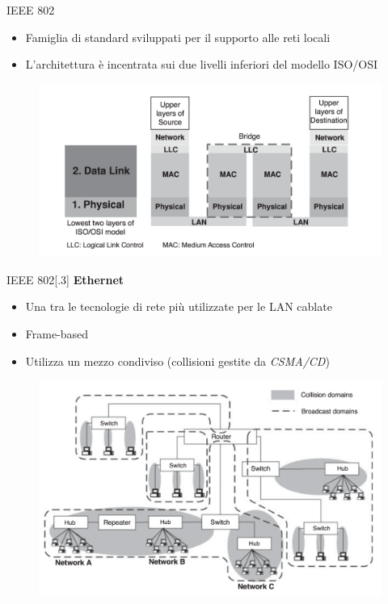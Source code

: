 \begin{frame}{IEEE 802}
	\begin{itemize}
		\item Famiglia di standard sviluppati per il supporto alle reti locali
		\item L'architettura è incentrata sui due livelli inferiori del modello ISO/OSI
	\end{itemize}
	\begin{figure}[h] 
		\includegraphics[scale=0.3,cfbox=blue_slides 1pt 0pt]{imgs/arch_ieee802.png}
	\end{figure}
\end{frame}

\begin{frame}{IEEE 802[.3]}
	\textbf{Ethernet}
	\begin{itemize}
		\item Una tra le tecnologie di rete più utilizzate per le LAN cablate
		\item Frame-based
		\item Utilizza un mezzo condiviso (collisioni gestite da \textit{CSMA/CD})
	\end{itemize}
	\begin{figure}[h] 
		\includegraphics[scale=0.23,cfbox=blue_slides 1pt 0pt]{imgs/lan.png}
	\end{figure}
\end{frame}

